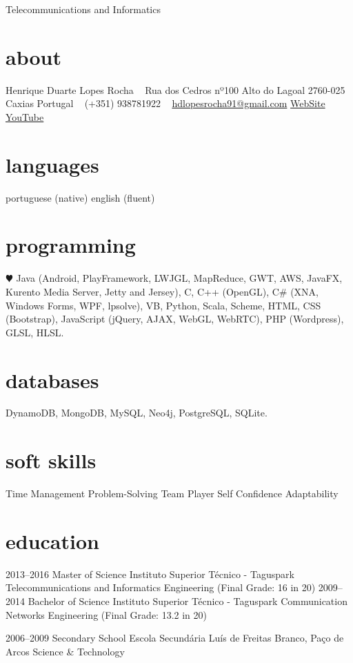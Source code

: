 \documentclass[]{friggeri-cv}
\begin{document}
       {Telecommunications and Informatics}

\begin{aside}
  \section{about}
    Henrique Duarte Lopes Rocha
    ~
    Rua dos Cedros nº100
    Alto do Lagoal
    2760-025 Caxias
    Portugal
    ~
    (+351) 938781922
    ~
    \href{mailto:hdlopesrocha91@gmail.com}{hdlopesrocha91@gmail.com}
    \href{http://web.ist.utl.pt/ist168621}{WebSite}
    \href{http://www.youtube.com/user/hdlopesrocha}{YouTube}
  \section{languages}
    portuguese (native)
    english (fluent)
  \section{programming}
    {\color{red} $\varheartsuit$} Java
	 (Android, PlayFramework, LWJGL, MapReduce, GWT, AWS, JavaFX, Kurento Media Server, Jetty and Jersey), C, C++ (OpenGL), C\# (XNA, Windows Forms, WPF, lpsolve), VB, Python, Scala, Scheme, HTML, CSS (Bootstrap), JavaScript (jQuery, AJAX, WebGL, WebRTC), PHP (Wordpress), GLSL, HLSL.  
   \section{databases}
	DynamoDB, MongoDB, MySQL, Neo4j, PostgreSQL, SQLite.
   \section{soft skills}
	Time Management
	Problem-Solving
	Team Player
	Self Confidence
	Adaptability
\end{aside}

\section{education}

\begin{entrylist}
   \entry
    {2013–2016}
    {Master of Science}
    {Instituto Superior Técnico - Taguspark}
    {Telecommunications and Informatics Engineering (Final Grade: 16 in 20)}
   \entry
    {2009–2014}
    {Bachelor of Science}
    {Instituto Superior Técnico - Taguspark}
    {Communication Networks Engineering (Final Grade: 13.2 in 20)}

   \entry
    {2006–2009}
    {Secondary School}
    {Escola Secundária Luís de Freitas Branco, Paço de Arcos}
    {Science \& Technology}

\end{entrylist}
\end{document}
